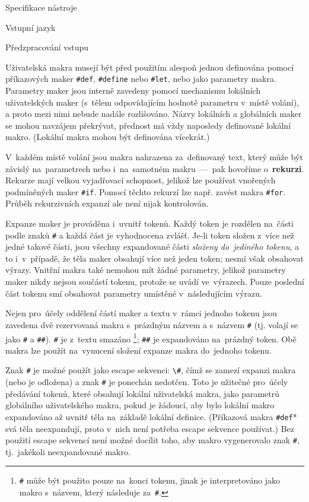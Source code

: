\documentclass[thesis=M,czech]{FITthesis}[2012/06/26]
\newcommand{\id}[1]{\texttt{#1}}
\newcommand{\hl}[1]{\textit{#1}}
\newcommand{\hll}[1]{\textbf{#1}}
\begin{document}
\begin{section}{Specifikace nástroje}
\begin{subsection}{Vstupní jazyk}
\begin{subsubsection}{Předzpracování vstupu}

\begin{paragraph}{Uživatelská makra}
\label{p:design:spec:ilang:macros:user}
musejí být před použitím alespoň jednou definována
pomocí příkazových maker \id{\#def}, \id{\#define} nebo \id{\#let},
nebo jako parametry makra.
Parametry maker jsou interně zavedeny pomocí mechanismu
lokálních uživatelských maker
(s~tělem odpovídajícím hodnotě parametru v~místě volání),
a proto mezi nimi
nebude nadále rozlišováno.
Názvy lokálních a globálních maker se mohou navzájem překrývat,
přednost má vždy naposledy definované lokální makro.
(Lokální makra mohou být definována vícekrát.)

V~každém místě volání jsou makra nahrazena za~definovaný text,
který může být závislý na~parametrech
nebo i~na~samotném makru~---~pak hovoříme o~\hll{rekurzi}.
Rekurze mají velkou vyjadřovací schopnost,
jelikož lze používat vnořených podmíněných maker \id{\#if}.
Pomocí těchto rekurzí lze např. zavést
makra \id{\#for}.
Průběh rekurzivních expanzí ale není nijak kontrolován.

Expanze maker je prováděna i~uvnitř tokenů.
Každý token je rozdělen na~části
podle znaků \id{\#}
a každá část je vyhodnocena zvlášť.
Je-li token složen z~více než jedné takové části,
jsou všechny expandované části \hl{složeny do~jediného tokenu},
a to i~v~případě, že těla maker obsahují více než jeden token;
nesmí však obsahovat výrazy.
Vnitřní makra také nemohou mít žádné parametry,
jelikož parametry maker nikdy nejsou součástí tokenu,
protože se uvádí ve~výrazech.
Pouze poslední část tokenu smí obsahovat parametry
umístěné v~následujícím výrazu.

Nejen pro~účely oddělení částí maker a textu v~rámci jednoho tokenu
jsou zavedena dvě rezervovaná makra s~prázdným názvem
a s~názvem \id{\#}
(tj. volají se jako \id{\#} a \id{\#\#}).
\id{\#} je z~textu smazáno%
\footnote{\id{\#} může být použito pouze na~konci tokenu,
jinak je interpretováno jako makro s~názvem,
který následuje za~\id{\#}.};
\id{\#\#} je expandováno na~prázdný token.
Obě makra lze použít na~vynucení složení expanze makra do~jednoho tokenu.

Znak \id{\#} je možné použít jako escape sekvenci:
\id{\textbackslash\#},
čímž se zamezí expanzi makra (nebo je odložena)
a znak \id{\#} je ponechán nedotčen.
Toto je užitečné pro~účely předávání
tokenů, které obsahují lokální uživatelská makra,
jako parametrů globálního uživatelského makra,
pokud je žádoucí, aby bylo lokální makro expandováno až uvnitř těla
na~základě lokální definice.
(Příkazová makra \id{\#def}* svá těla neexpandují,
proto v~nich není potřeba escape sekvence používat.)
Bez použití escape sekvencí
není možné docílit toho, aby makro vygenerovalo znak \id{\#},
tj.~jakékoli neexpandované makro.


\end{paragraph}
\end{subsubsection}
\end{subsection}
\end{section}
\end{document}
